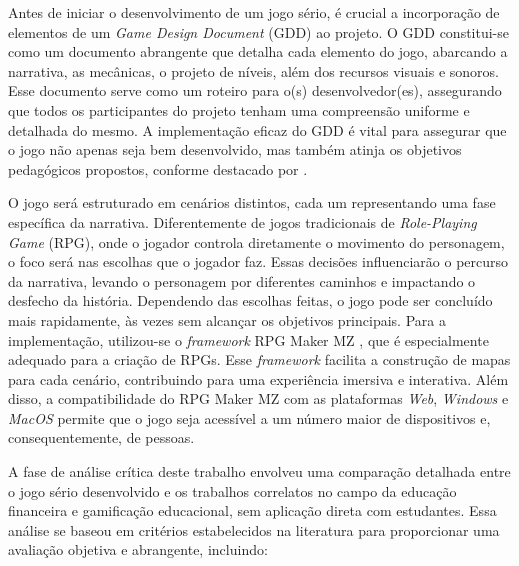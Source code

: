 Antes de iniciar o desenvolvimento de um jogo sério, é crucial a incorporação de elementos de um \textit{Game Design Document} (GDD) ao projeto. O GDD constitui-se como um documento abrangente que detalha cada elemento do jogo, abarcando a narrativa, as mecânicas, o projeto de níveis, além dos recursos visuais e sonoros. Esse documento serve como um roteiro para o(s) desenvolvedor(es), assegurando que todos os participantes do projeto tenham uma compreensão uniforme e detalhada do mesmo. A implementação eficaz do GDD é vital para assegurar que o jogo não apenas seja bem desenvolvido, mas também atinja os objetivos pedagógicos propostos, conforme destacado por \cite{arifudin2022gdd}.

O jogo será estruturado em cenários distintos, cada um representando uma fase específica da narrativa. Diferentemente de jogos tradicionais de \textit{Role-Playing Game} (RPG), onde o jogador controla diretamente o movimento do personagem, o foco será nas escolhas que o jogador faz. Essas decisões influenciarão o percurso da narrativa, levando o personagem por diferentes caminhos e impactando o desfecho da história. Dependendo das escolhas feitas, o jogo pode ser concluído mais rapidamente, às vezes sem alcançar os objetivos principais. Para a implementação, utilizou-se o \textit{framework} RPG Maker MZ \cite{RPGMakerMZ}, que é especialmente adequado para a criação de RPGs. Esse \textit{framework} facilita a construção de mapas para cada cenário, contribuindo para uma experiência imersiva e interativa. Além disso, a compatibilidade do RPG Maker MZ com as plataformas \textit{Web}, \textit{Windows} e \textit{MacOS} permite que o jogo seja acessível a um número maior de dispositivos e, consequentemente, de pessoas.

A fase de análise crítica deste trabalho envolveu uma comparação detalhada entre o jogo sério desenvolvido e os trabalhos correlatos no campo da educação financeira e gamificação educacional, sem aplicação direta com estudantes. Essa análise se baseou em critérios estabelecidos na literatura para proporcionar uma avaliação objetiva e abrangente, incluindo:

